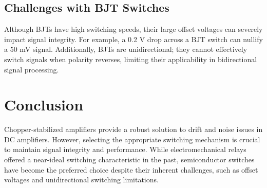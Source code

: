 \subsection{Challenges with BJT Switches}
Although BJTs have high switching speeds, their large offset voltages can severely impact signal integrity. For example, a 0.2 V drop across a BJT switch can nullify a 50 mV signal. Additionally, BJTs are unidirectional; they cannot effectively switch signals when polarity reverses, limiting their applicability in bidirectional signal processing.

\section{Conclusion}
Chopper-stabilized amplifiers provide a robust solution to drift and noise issues in DC amplifiers. However, selecting the appropriate switching mechanism is crucial to maintain signal integrity and performance. While electromechanical relays offered a near-ideal switching characteristic in the past, semiconductor switches have become the preferred choice despite their inherent challenges, such as offset voltages and unidirectional switching limitations.

